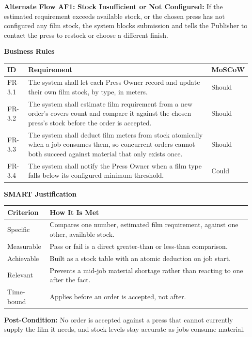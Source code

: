 \documentclass{scrreprt}
\begin{document}
\textbf{Alternate Flow AF1: Stock Insufficient or Not Configured:} If the estimated requirement exceeds available stock, or the chosen press has not configured any film stock, the system blocks submission and tells the Publisher to contact the press to restock or choose a different finish.

\textbf{Business Rules}
\begin{longtable}{p{} L{0.76\textwidth} p{0.12\textwidth}}
\toprule
{} \textbf{ID} & \textbf{Requirement} & \textbf{MoSCoW} \\
\midrule
\endhead
FR-3.1 & The system shall let each Press Owner record and update their own film stock, by type, in meters. & Should \\
FR-3.2 & The system shall estimate film requirement from a new order's covers count and compare it against the chosen press's stock before the order is accepted. & Should \\
FR-3.3 & The system shall deduct film meters from stock atomically when a job consumes them, so concurrent orders cannot both succeed against material that only exists once. & Should \\
FR-3.4 & The system shall notify the Press Owner when a film type falls below its configured minimum threshold. & Could \\
\bottomrule
\end{longtable}

\textbf{SMART Justification}
\begin{longtable}{p{} L{0.82\textwidth}}
\toprule
{} \textbf{Criterion} & \textbf{How It Is Met} \\
\midrule
\endhead
Specific & Compares one number, estimated film requirement, against one other, available stock. \\
Measurable & Pass or fail is a direct greater-than or less-than comparison. \\
Achievable & Built as a stock table with an atomic deduction on job start. \\
Relevant & Prevents a mid-job material shortage rather than reacting to one after the fact. \\
Time-bound & Applies before an order is accepted, not after. \\
\bottomrule
\end{longtable}

\textbf{Post-Condition:} No order is accepted against a press that cannot currently supply the film it needs, and stock levels stay accurate as jobs consume material.
\end{document}
